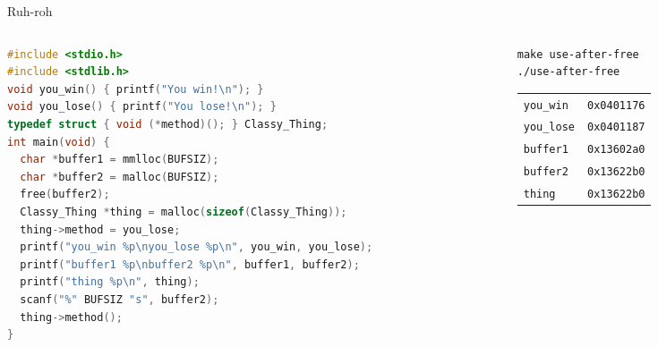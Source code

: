 \documentclass[9pt,aspectratio=169]{beamer}
\begin{document}
\begin{frame}[label={sec:orge5e2df1},fragile]{Ruh-roh}
 \begin{columns}
\begin{column}[t]{0.49\columnwidth}
\begin{lstlisting}[language=C,numbers=none]
#include <stdio.h>
#include <stdlib.h>
void you_win() { printf("You win!\n"); }
void you_lose() { printf("You lose!\n"); }
typedef struct { void (*method)(); } Classy_Thing;
int main(void) {
  char *buffer1 = mmlloc(BUFSIZ);
  char *buffer2 = malloc(BUFSIZ);
  free(buffer2);
  Classy_Thing *thing = malloc(sizeof(Classy_Thing));
  thing->method = you_lose;
  printf("you_win %p\nyou_lose %p\n", you_win, you_lose);
  printf("buffer1 %p\nbuffer2 %p\n", buffer1, buffer2);
  printf("thing %p\n", thing);
  scanf("%" BUFSIZ "s", buffer2);
  thing->method();
}
\end{lstlisting}
\end{column}
\begin{column}[t]{0.49\columnwidth}
\begin{verbatim}
make use-after-free
./use-after-free 
\end{verbatim}

\begin{center}
\begin{tabular}{ll}
\texttt{you\_win} & \texttt{0x0401176}\\[0pt]
\texttt{you\_lose} & \texttt{0x0401187}\\[0pt]
\texttt{buffer1} & \texttt{0x13602a0}\\[0pt]
\texttt{buffer2} & \texttt{0x13622b0}\\[0pt]
\texttt{thing} & \texttt{0x13622b0}\\[0pt]
\end{tabular}
\end{center}
\end{column}
\end{columns}
\end{frame}
\end{document}
